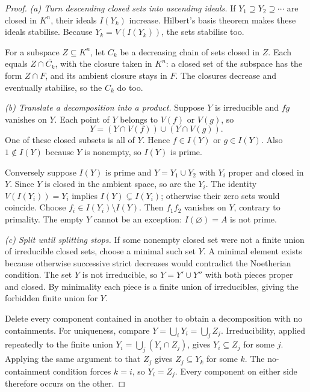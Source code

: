 \begin{proof}
\emph{(a) Turn descending closed sets into ascending ideals.} If $Y_1\supseteq Y_2\supseteq\cdots$ are closed in $K^n$, their ideals $I(Y_k)$ increase. Hilbert's basis theorem makes these ideals stabilise. Because $Y_k=V(I(Y_k))$, the sets stabilise too.

For a subspace $Z\subseteq K^n$, let $C_k$ be a decreasing chain of sets closed in $Z$. Each equals $Z\cap\overline{C_k}$, with the closure taken in $K^n$: a closed set of the subspace has the form $Z\cap F$, and its ambient closure stays in $F$. The closures decrease and eventually stabilise, so the $C_k$ do too.

\emph{(b) Translate a decomposition into a product.} Suppose $Y$ is irreducible and $fg$ vanishes on $Y$. Each point of $Y$ belongs to $V(f)$ or $V(g)$, so
\[
Y=(Y\cap V(f))\cup(Y\cap V(g)).
\]
One of these closed subsets is all of $Y$. Hence $f\in I(Y)$ or $g\in I(Y)$. Also $1\notin I(Y)$ because $Y$ is nonempty, so $I(Y)$ is prime.

Conversely suppose $I(Y)$ is prime and $Y=Y_1\cup Y_2$ with $Y_i$ proper and closed in $Y$. Since $Y$ is closed in the ambient space, so are the $Y_i$. The identity $V(I(Y_i))=Y_i$ implies $I(Y)\subsetneq I(Y_i)$; otherwise their zero sets would coincide. Choose $f_i\in I(Y_i)\setminus I(Y)$. Then $f_1f_2$ vanishes on $Y$, contrary to primality. The empty $Y$ cannot be an exception: $I(\varnothing)=A$ is not prime.

\emph{(c) Split until splitting stops.} If some nonempty closed set were not a finite union of irreducible closed sets, choose a minimal such set $Y$. A minimal element exists because otherwise successive strict decreases would contradict the Noetherian condition. The set $Y$ is not irreducible, so $Y=Y'\cup Y''$ with both pieces proper and closed. By minimality each piece is a finite union of irreducibles, giving the forbidden finite union for $Y$.

Delete every component contained in another to obtain a decomposition with no containments. For uniqueness, compare $Y=\bigcup_iY_i=\bigcup_jZ_j$. Irreducibility, applied repeatedly to the finite union $Y_i=\bigcup_j(Y_i\cap Z_j)$, gives $Y_i\subseteq Z_j$ for some $j$. Applying the same argument to that $Z_j$ gives $Z_j\subseteq Y_k$ for some $k$. The no-containment condition forces $k=i$, so $Y_i=Z_j$. Every component on either side therefore occurs on the other.
\end{proof}

